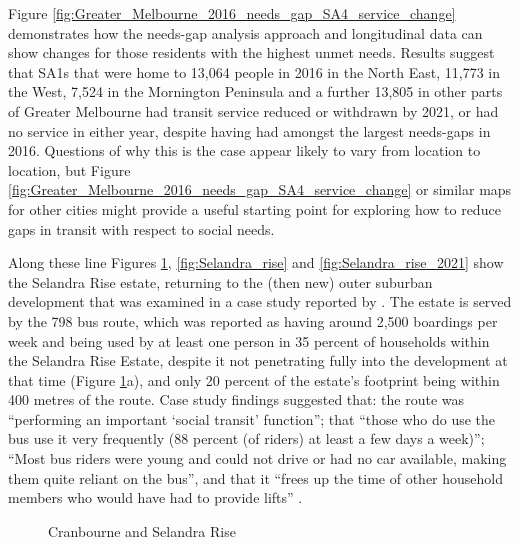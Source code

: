 \documentclass[preprint, 3p,
authoryear]{elsarticle} %
\begin{document}
Figure \ref{fig:Greater_Melbourne_2016_needs_gap_SA4_service_change}
demonstrates how the needs-gap analysis approach and longitudinal data
can show changes for those residents with the highest unmet needs.
Results suggest that SA1s that were home to 13,064 people in 2016 in the
North East, 11,773 in the West, 7,524 in the Mornington Peninsula and a
further 13,805 in other parts of Greater Melbourne had transit service
reduced or withdrawn by 2021, or had no service in either year, despite
having had amongst the largest needs-gaps in 2016. Questions of why this
is the case appear likely to vary from location to location, but Figure
\ref{fig:Greater_Melbourne_2016_needs_gap_SA4_service_change} or similar
maps for other cities might provide a useful starting point for
exploring how to reduce gaps in transit with respect to social needs.

Along these line Figures \ref{fig:Bus_798}, \ref{fig:Selandra_rise} and
\ref{fig:Selandra_rise_2021} show the Selandra Rise estate, returning to
the (then new) outer suburban development that was examined in a case
study reported by \citet{delbosc2015impact}. The estate is served by the
798 bus route, which was reported as having around 2,500 boardings per
week and being used by at least one person in 35 percent of households
within the Selandra Rise Estate, despite it not penetrating fully into
the development at that time (Figure \ref{fig:Bus_798}a), and only 20
percent of the estate's footprint being within 400 metres of the route.
Case study findings suggested that: the route was ``performing an
important `social transit' function''; that ``those who do use the bus
use it very frequently (88 percent (of riders) at least a few days a
week)''; ``Most bus riders were young and could not drive or had no car
available, making them quite reliant on the bus'', and that it ``frees
up the time of other household members who would have had to provide
lifts'' \citep[10]{delbosc2015impact}.

\begin{figure}

{\centering {}

}

\caption{Cranbourne and Selandra Rise}\label{fig:Bus_798}
\end{figure}
\end{document}
